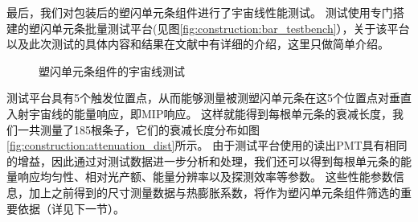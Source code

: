 最后，我们对包装后的塑闪单元条组件进行了宇宙线性能测试。
测试使用专门搭建的塑闪单元条批量测试平台(见图\ref{fig:construction:bar_testbench}），关于该平台以及此次测试的具体内容和结果在文献\cite{bar_test_2015}中有详细的介绍，这里只做简单介绍。
\begin{figure}[htb]
\centering
{}
\caption{塑闪单元条组件的宇宙线测试}
\label{fig:construction:bar_cosmictest}
\end{figure}
测试平台具有5个触发位置点，从而能够测量被测塑闪单元条在这5个位置点对垂直入射宇宙线的能量响应，即MIP响应。
这样就能得到每根单元条的衰减长度，我们一共测量了185根条子，它们的衰减长度分布如图\ref{fig:construction:attenuation_dist}所示。
由于测试平台使用的读出PMT具有相同的增益\cite{bar_test_2015}，因此通过对测试数据进一步分析和处理，我们还可以得到每根单元条的能量响应均匀性、相对光产额、能量分辨率以及探测效率等参数。
这些性能参数信息，加上之前得到的尺寸测量数据与热膨胀系数，将作为塑闪单元条组件筛选的重要依据（详见下一节）。


